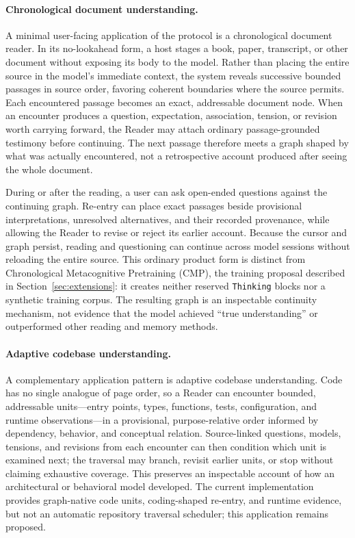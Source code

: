 \paragraph{Chronological document understanding.}
A minimal user-facing application of the protocol is a chronological document reader. In its no-lookahead form, a host stages a book, paper, transcript, or other document without exposing its body to the model. Rather than placing the entire source in the model's immediate context, the system reveals successive bounded passages in source order, favoring coherent boundaries where the source permits. Each encountered passage becomes an exact, addressable document node. When an encounter produces a question, expectation, association, tension, or revision worth carrying forward, the Reader may attach ordinary passage-grounded testimony before continuing. The next passage therefore meets a graph shaped by what was actually encountered, not a retrospective account produced after seeing the whole document.

During or after the reading, a user can ask open-ended questions against the continuing graph. Re-entry can place exact passages beside provisional interpretations, unresolved alternatives, and their recorded provenance, while allowing the Reader to revise or reject its earlier account. Because the cursor and graph persist, reading and questioning can continue across model sessions without reloading the entire source. This ordinary product form is distinct from Chronological Metacognitive Pretraining (CMP), the training proposal described in Section~\ref{sec:extensions}: it creates neither reserved \texttt{Thinking} blocks nor a synthetic training corpus. The resulting graph is an inspectable continuity mechanism, not evidence that the model achieved ``true understanding'' or outperformed other reading and memory methods.

\paragraph{Adaptive codebase understanding.}
A complementary application pattern is adaptive codebase understanding. Code has no single analogue of page order, so a Reader can encounter bounded, addressable units---entry points, types, functions, tests, configuration, and runtime observations---in a provisional, purpose-relative order informed by dependency, behavior, and conceptual relation. Source-linked questions, models, tensions, and revisions from each encounter can then condition which unit is examined next; the traversal may branch, revisit earlier units, or stop without claiming exhaustive coverage. This preserves an inspectable account of how an architectural or behavioral model developed. The current implementation provides graph-native code units, coding-shaped re-entry, and runtime evidence, but not an automatic repository traversal scheduler; this application remains proposed.

